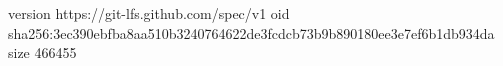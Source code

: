version https://git-lfs.github.com/spec/v1
oid sha256:3ec390ebfba8aa510b3240764622de3fcdcb73b9b890180ee3e7ef6b1db934da
size 466455
